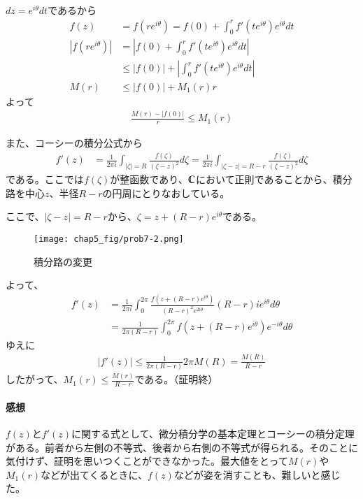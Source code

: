 $dz=e^{i\theta}dt$であるから
\begin{align*}
    f(z)&=f(re^{i\theta})
    =f(0)+\int_{0}^{r}f'(te^{i\theta})e^{i\theta}dt\\
    |f(re^{i\theta})|
    &=\left|f(0)+\int_{0}^{r}f'(te^{i\theta})e^{i\theta}dt\right|\\
    &\le|f(0)|+\left|\int_{0}^{r}f'(te^{i\theta})e^{i\theta}dt\right|\\
    M(r)&\le|f(0)|+M_1(r)r
\end{align*}
よって
\begin{align*}
    \frac{M(r)-|f(0)|}{r}\le M_1(r)
\end{align*}

また、コーシーの積分公式から
\begin{align*}
    f'(z)&=\frac{1}{2\pi i}\int_{|\zeta|=R}\frac{f(\zeta)}{(\zeta-z)^2}d\zeta
    =\frac{1}{2\pi i}\int_{|\zeta-z|=R-r}\frac{f(\zeta)}{(\zeta-z)^2}d\zeta
\end{align*}
である。ここでは$f(\zeta)$が整函数であり、$\mathbb{C}$において正則であることから、積分路を中心$z$、半径$R-r$の円周にとりなおしている。

ここで、$|\zeta-z|=R-r$から、$\zeta=z+(R-r)e^{i\theta}$である。

\begin{figure}[h]
    \centering
    \texttt{[image: chap5\_fig/prob7-2.png]}
    \caption{積分路の変更}
    \label{fig:chap5-7-2}
\end{figure}

よって、
\begin{align*}
    f'(z)&=\frac{1}{2\pi i}\int_{0}^{2\pi}
    \frac{f(z+(R-r)e^{i\theta})}{(R-r)^2e^{2i\theta}}(R-r)ie^{i\theta}d\theta\\
    &=\frac{1}{2\pi(R-r)}\int_{0}^{2\pi}
    f(z+(R-r)e^{i\theta})e^{-i\theta}d\theta
\end{align*}
ゆえに
\begin{align*}
    |f'(z)|\le\frac{1}{2\pi(R-r)}2\pi M(R)=\frac{M(R)}{R-r}
\end{align*}
したがって、$M_1(r)\le\frac{M(r)}{R-r}$である。（証明終）

\paragraph{感想}
$f(z)$と$f'(z)$に関する式として、微分積分学の基本定理とコーシーの積分定理がある。前者から左側の不等式、後者から右側の不等式が得られる。そのことに気付けず、証明を思いつくことができなかった。最大値をとって$M(r)$や$M_1(r)$などが出てくるときに、$f(z)$などが姿を消すことも、難しいと感じた。

